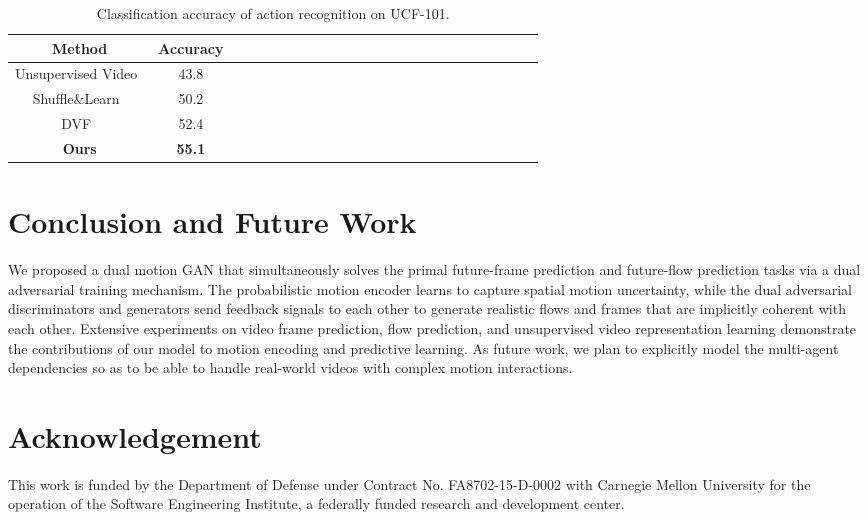 \documentclass[10pt,twocolumn,letterpaper]{article}
\begin{document}
	\begin{table}[!tp]
		\centering\renewcommand{}\footnotesize
		\caption{Classification accuracy of action recognition on UCF-101.}\label{tab:action}
		\begin{tabular}{c|cccccccccccccccccccccp{6em}p{5em}}
			\toprule
			Method & Accuracy\\
			\hline
			Unsupervised Video~\cite{wang2015unsupervised} & 43.8\\
			\hline
			Shuffle\&Learn~\cite{misra2016shuffle} & 50.2\\
			\hline
			DVF~\cite{liu2017video} & 52.4\\
			\hline
			\textbf{Ours} & \textbf{55.1}\\
			\bottomrule
		\end{tabular}%
		\vspace{-8mm}
	\end{table}%
	
	\section{Conclusion and Future Work}
	
We proposed a dual motion GAN that simultaneously solves the primal future-frame prediction and future-flow prediction tasks via a dual adversarial training mechanism. The probabilistic motion encoder learns to capture spatial motion uncertainty, while the dual adversarial discriminators and generators send feedback signals to each other to generate realistic flows and frames that are implicitly coherent with each other. Extensive experiments on video frame prediction, flow prediction, and unsupervised video representation learning demonstrate the contributions of our model to motion encoding and predictive learning. As future work, we plan to explicitly model the multi-agent dependencies so as to be able to handle real-world videos with complex motion interactions.

\section*{Acknowledgement}
This work is funded by the Department of Defense under Contract No. FA8702-15-D-0002 with Carnegie Mellon University for the operation of the Software Engineering Institute, a federally funded research and development center.

	{\small
		
		
	}
	
\end{document}

